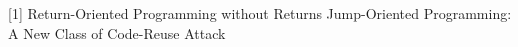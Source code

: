 \begin{thebibliography}{}
[1] Return-Oriented Programming without Returns
 Jump-Oriented Programming: A New Class of Code-Reuse Attack

\end{thebibliography}